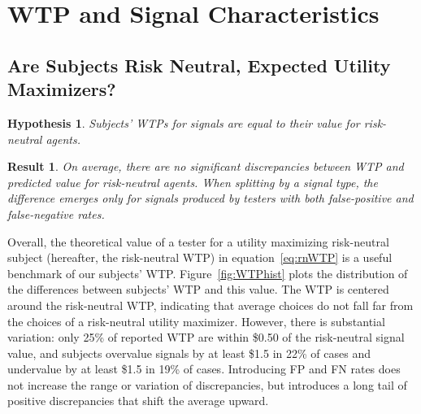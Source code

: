 \documentclass[12pt,a4paper]{article}
\newtheorem{hypothesis}{Hypothesis}
\newtheorem{result}{Result}
\begin{document}
\vspace{20pt}

\section{WTP and Signal Characteristics}\label{sec:results}

\subsection{Are Subjects Risk Neutral, Expected Utility Maximizers?} 

\begin{hypothesis}\label{hyp:eqRN} 
Subjects' WTPs for signals are equal to their value for risk-neutral agents. 
\end{hypothesis}

\begin{result} 
On average, there are no significant discrepancies between WTP and predicted value for risk-neutral agents. When splitting by a signal type, the difference emerges only for signals produced by testers with both false-positive and false-negative rates.
\end{result}



%

Overall, the theoretical value of a tester for a utility maximizing risk-neutral subject (hereafter, the risk-neutral WTP) in equation~\ref{eq:rnWTP} is a useful benchmark of our subjects' WTP. Figure~\ref{fig:WTPhist} plots the distribution of the differences between subjects' WTP and this value.  
The WTP is centered around the risk-neutral WTP, indicating that average choices do not fall far from the choices of a risk-neutral utility maximizer. However, there is substantial variation: only 25\% of reported WTP are within \$0.50 of the risk-neutral signal value, and subjects overvalue signals by at least \$1.5 in 22\% of cases and undervalue by at least \$1.5 in 19\% of cases. Introducing FP and FN rates does not increase the range or variation of discrepancies, but introduces a long tail of positive discrepancies that shift the average upward.
\end{document}
